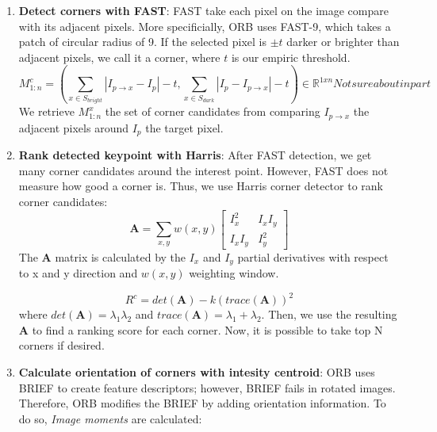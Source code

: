 \documentclass[a4paper]{report}
\numberwithin{figure}{section}
\newcommand{\R}{\mathbb{R}}
\begin{document}
\begin{enumerate}
  \item \textbf{Detect corners with FAST}: FAST take each pixel on 
    the image compare with its adjacent pixels. More specificially, 
    ORB uses FAST-9, which takes a patch of circular radius of 9. If the 
    selected pixel is $\pm t$ darker or brighter than adjacent pixels, 
    we call it a corner, where $t$ is our empiric threshold.
\begin{equation}
  M^c_{1:n} = 
  (\sum_{x \in S_{bright}} |I_{p \rightarrow x} - I_p| - t, 
  \sum_{x \in S_{dark}} |I_p - I_{p \rightarrow x}| - t) \in  \R^{1xn} 
  Not sure about in part
\end{equation}
    We retrieve $M^x_{1:n}$ the set of corner candidates from 
    comparing $I_{p\rightarrow x}$ the adjacent pixels around $I_p$ the target pixel.

  \item \textbf{Rank detected keypoint with Harris}: After FAST detection, 
    we get many corner candidates around the interest point. However, 
    FAST does not measure how good a corner is. Thus, we use Harris corner 
    detector to rank corner candidates:
    \begin{equation}
      \mathbf{A} = \sum_{x,y} w(x,y) 
      \begin{bmatrix}
        I_x^2 & I_xI_y \\ I_xI_y & I_y^2
      \end{bmatrix}
    \end{equation}
    The $\mathbf{A}$ matrix is calculated by the $I_x$ and $I_y$ partial 
    derivatives with respect to x and y direction and $w(x,y)$ weighting window.

    \begin{equation}
      R^c = det(\mathbf{A}) - k(trace(\mathbf{A}))^2
    \end{equation}
    where $det(\mathbf{A}) = \lambda_1 \lambda_2$ and 
    $trace(\mathbf{A}) = \lambda_1 + \lambda_2$.
    Then, we use the resulting $\mathbf{A}$ to find a ranking score for each 
    corner. Now, it is possible to take top N corners if desired.

  \item \textbf{Calculate orientation of corners with intesity centroid}: 
    ORB uses BRIEF to create feature descriptors; however, BRIEF fails in 
    rotated images. Therefore, ORB modifies the BRIEF by adding orientation 
    information. To do so, \textit{Image moments} are calculated:


\end{enumerate}
\end{document}
